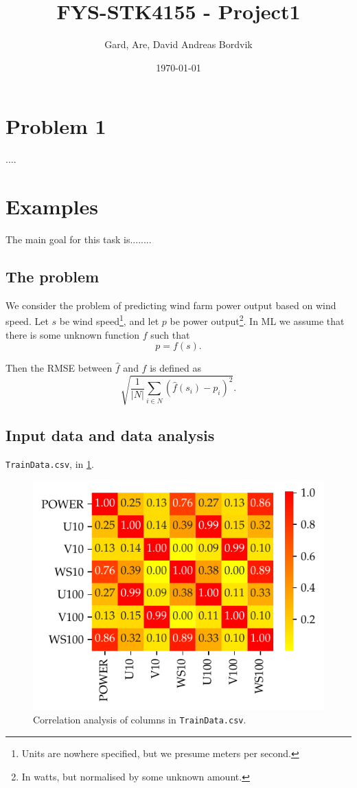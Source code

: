 \documentclass[11pt]{article}
\title{FYS-STK4155 - Project1}
\author{Gard, Are, David Andreas Bordvik}
\date{\today}
\begin{document}
\maketitle
\section*{Problem 1}
....
\newpage
\newpage
\section*{Examples}
The main goal for this task is........


\subsection*{The problem}
We consider the problem of predicting wind farm power output based on wind speed.
Let $s$ be wind speed\footnote{Units are nowhere specified, but we presume meters per second.}, and let $p$ be power output\footnote{In watts, but normalised by some unknown amount.}. In ML we assume that there is some unknown function $f$ such that
\begin{equation*}
  p = f(s).
\end{equation*}

Then the RMSE between $\hat{f}$ and $f$ is defined as
\begin{equation*}
  \sqrt{\frac{1}{|N|} \sum_{i \in N} \left(\hat{f}(s_i) - p_i\right)^2}.
\end{equation*}


\subsection*{Input data and data analysis}
\texttt{TrainData.csv}, in \cref{fig:q1-corr-analysis}.

\begin{figure}
  \centering
  \includegraphics{figures/q1_corr_analysis.pdf}
  \caption{Correlation analysis of columns in \texttt{TrainData.csv}.}
  \label{fig:q1-corr-analysis}
\end{figure}
\end{document}

